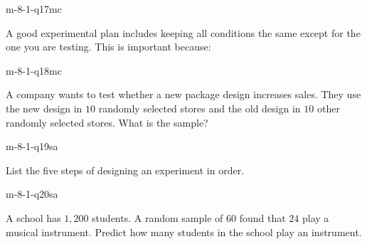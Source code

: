 \begin{practiceQuestion}{m-8-1-q17}{mc}
\begin{questionText}
A good experimental plan includes keeping all conditions the same except for the one you are testing. This is important because:
\end{questionText}
\end{practiceQuestion}

\begin{practiceQuestion}{m-8-1-q18}{mc}
\begin{questionText}
A company wants to test whether a new package design increases sales. They use the new design in $10$ randomly selected stores and the old design in $10$ other randomly selected stores. What is the sample?
\end{questionText}
\end{practiceQuestion}


\begin{practiceQuestion}{m-8-1-q19}{sa}
\begin{questionText}
List the five steps of designing an experiment in order.
\end{questionText}
\end{practiceQuestion}

\begin{practiceQuestion}{m-8-1-q20}{sa}
\begin{questionText}
A school has $1{,}200$ students. A random sample of $60$ found that $24$ play a musical instrument. Predict how many students in the school play an instrument.
\end{questionText}
\end{practiceQuestion}

